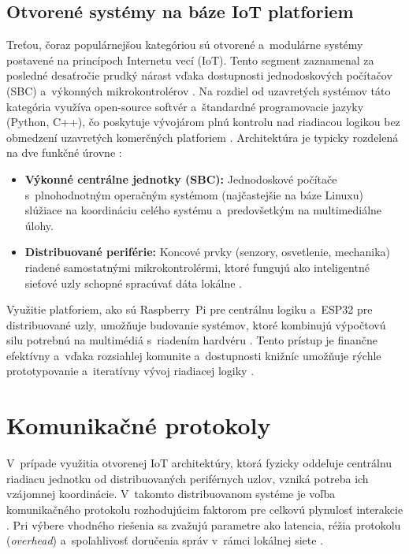\subsection{Otvorené systémy na báze IoT platforiem}
\label{otvorene-iot}

Treťou, čoraz populárnejšou kategóriou sú otvorené a~modulárne
systémy postavené na princípoch Internetu vecí (IoT). Tento segment
zaznamenal za posledné desaťročie prudký nárast vďaka dostupnosti
jednodoskových počítačov (SBC) a~výkonných mikrokontrolérov
\cite{microcontrollers_museum_arxiv}. Na rozdiel od uzavretých
systémov táto kategória využíva open-source softvér a~štandardné
programovacie jazyky (Python, C++), čo poskytuje vývojárom
plnú kontrolu nad riadiacou logikou bez obmedzení uzavretých
komerčných platforiem \cite{microcontrollers_museum_arxiv}.
Architektúra je typicky rozdelená na dve funkčné úrovne \cite{rpi_esp32_scada}:

\begin{itemize}
    \item \textbf{Výkonné centrálne jednotky (SBC):} Jednodoskové
        počítače s~plnohodnotným operačným systémom (najčastejšie
        na báze Linuxu) slúžiace na koordináciu celého systému
        a~predovšetkým na multimediálne úlohy.
    \item \textbf{Distribuované periférie:} Koncové prvky (senzory,
        osvetlenie, mechanika) riadené samostatnými mikrokontrolérmi,
        ktoré fungujú ako inteligentné sieťové uzly schopné
        spracúvať dáta lokálne \cite{distributed_control_modeling}.
\end{itemize}

Využitie platforiem, ako sú Raspberry~Pi pre centrálnu logiku a~ESP32
pre distribuované uzly, umožňuje budovanie systémov, ktoré kombinujú
výpočtovú silu potrebnú na multimédiá s~riadením
hardvéru \cite{rpi_esp32_scada}. Tento prístup je finančne efektívny
a~vďaka rozsiahlej komunite a~dostupnosti knižníc umožňuje rýchle
prototypovanie a~iteratívny vývoj riadiacej logiky
\cite{rpi_esp32_scada, interactive_small_museums}.

\section{Komunikačné protokoly}
\label{komunikacne-protokoly}

V~prípade využitia otvorenej IoT architektúry, ktorá fyzicky
oddeľuje centrálnu riadiacu jednotku od distribuovaných periférnych
uzlov, vzniká potreba ich vzájomnej koordinácie.
V~takomto distribuovanom systéme je voľba komunikačného
protokolu rozhodujúcim faktorom pre celkovú plynulosť
interakcie \cite{rpi_esp32_scada}. Pri výbere vhodného
riešenia sa zvažujú parametre ako latencia, réžia
protokolu (\textit{overhead}) a~spoľahlivosť doručenia
správ v~rámci lokálnej siete \cite{mqtt_http_latency}.

